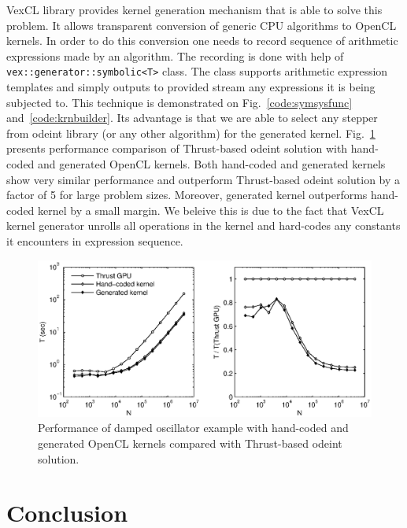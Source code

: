 \documentclass[1p]{elsarticle}
\newcommand{\code}[1]{\lstinline|#1|}
\newcommand{\figref}[1]{Fig.~\ref{#1}}
\begin{document}
VexCL library provides kernel generation mechanism that is able to solve this
problem. It allows transparent conversion of generic CPU algorithms to OpenCL
kernels. In order to do this conversion one needs to record sequence of
arithmetic expressions made by an algorithm.  The recording is done with help
of \code{vex::generator::symbolic<T>} class. The class supports arithmetic
expression templates and simply outputs to provided stream any expressions it
is being subjected to. This technique is demonstrated on
\figref{code:symsysfunc} and~\ref{code:krnbuilder}. Its advantage is
that we are able to select any stepper from odeint library (or any other
algorithm) for the generated kernel. \figref{fig:genkernel} presents
performance comparison of Thrust-based odeint solution with hand-coded and
generated OpenCL kernels. Both hand-coded and generated kernels show very
similar performance and outperform Thrust-based odeint solution by a factor of
5 for large problem sizes. Moreover, generated kernel outperforms hand-coded
kernel by a small margin. We beleive this is due to the fact that VexCL kernel
generator unrolls all operations in the kernel and hard-codes any constants it
encounters in expression sequence.

\begin{figure}[p]
    \begin{center}
        \includegraphics[width=\textwidth]{data/damped_oscillator/genkernel}
    \end{center}
    \caption{Performance of damped oscillator example with hand-coded and
    generated OpenCL kernels compared with Thrust-based odeint solution.}
    \label{fig:genkernel}
\end{figure}

\section{Conclusion}
\end{document}
